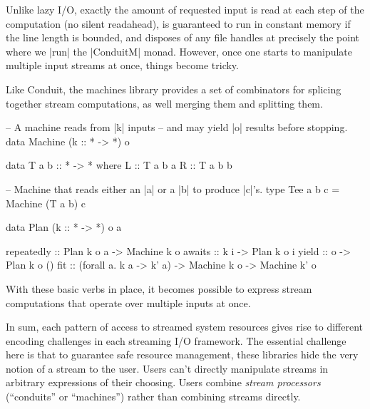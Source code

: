 \documentclass[11pt]{article}
\begin{document}
Unlike lazy I/O, exactly the amount of requested input is read at each
step of the computation (no silent readahead), is guaranteed to run in
constant memory if the line length is bounded, and disposes of any
file handles at precisely the point where we |run| the |ConduitM|
monad. However, once one starts to manipulate multiple input streams
at once, things become tricky.

Like Conduit, the machines library provides a set of combinators for
splicing together stream computations, as well merging them and
splitting them.
\begin{code}
-- A machine reads from |k| inputs
-- and may yield |o| results before stopping.
data Machine (k :: * -> *) o

data T a b :: * -> * where
  L :: T a b a
  R :: T a b b

-- Machine that reads either an |a| or a |b| to produce |c|'s.
type Tee a b c = Machine (T a b) c

data Plan (k :: * -> *) o a

repeatedly :: Plan k o a -> Machine k o
awaits :: k i -> Plan k o i
yield :: o -> Plan k o ()
fit :: (forall a. k a -> k' a) -> Machine k o -> Machine k' o
\end{code}
With these basic verbs in place, it becomes possible to express stream
computations that operate over multiple inputs at once.

In sum, each pattern of access to streamed system resources gives rise
to different encoding challenges in each streaming I/O framework. The
essential challenge here is that to guarantee safe resource
management, these libraries hide the very notion of a stream to the
user. Users can't directly manipulate streams in arbitrary expressions
of their choosing. Users combine {\em stream processors} (``conduits''
or ``machines'') rather than combining streams directly.
\end{document}

